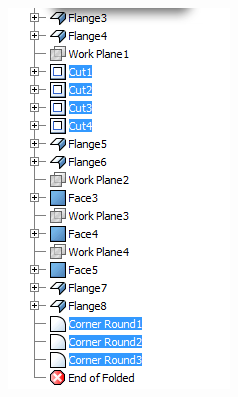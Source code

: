\begin{minipage}{\linewidth}
\begin{minipage}[c]{0.3\linewidth}
\includegraphics[width=\linewidth,valign=t]{images/CommercialBracket_PhI_tree}
 \label{fig:results:CommercialBracket_PhItree}
\end{minipage}
\end{minipage}



%
%
%


